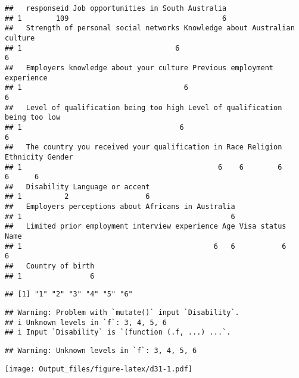 \documentclass[
]{article}
\begin{document}
\begin{verbatim}
##   responseid Job opportunities in South Australia
## 1        109                                    6
##   Strength of personal social networks Knowledge about Australian culture
## 1                                    6                                  6
##   Employers knowledge about your culture Previous employment experience
## 1                                      6                              6
##   Level of qualification being too high Level of qualification being too low
## 1                                     6                                    6
##   The country you received your qualification in Race Religion Ethnicity Gender
## 1                                              6    6        6         6      6
##   Disability Language or accent
## 1          2                  6
##   Employers perceptions about Africans in Australia
## 1                                                 6
##   Limited prior employment interview experience Age Visa status Name
## 1                                             6   6           6    6
##   Country of birth
## 1                6
\end{verbatim}

\begin{verbatim}
## [1] "1" "2" "3" "4" "5" "6"
\end{verbatim}

\begin{verbatim}
## Warning: Problem with `mutate()` input `Disability`.
## i Unknown levels in `f`: 3, 4, 5, 6
## i Input `Disability` is `(function (.f, ...) ...`.
\end{verbatim}

\begin{verbatim}
## Warning: Unknown levels in `f`: 3, 4, 5, 6
\end{verbatim}

\texttt{[image: Output\_files/figure-latex/d31-1.pdf]}
\end{document}

